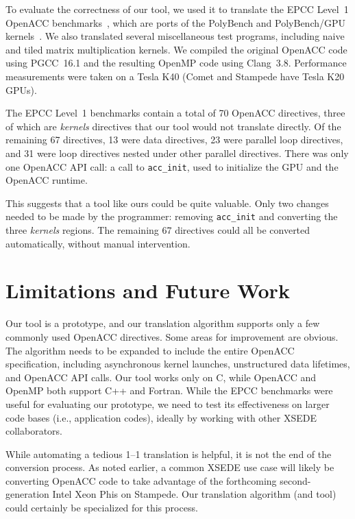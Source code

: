 \documentclass{sig-alternate-05-2015}
\begin{document}
To evaluate the correctness of our tool, we used it to translate the EPCC
Level~1 OpenACC benchmarks~\cite{epcc}, which are ports of the PolyBench and
PolyBench/GPU kernels~\cite{polybench}.  We also translated several
miscellaneous test programs, including naive and tiled matrix multiplication
kernels.  We compiled the original OpenACC code using PGCC~16.1 and the
resulting OpenMP code using Clang~3.8.  Performance measurements were taken on
a Tesla K40 (Comet and Stampede have Tesla K20 GPUs).

The EPCC Level~1 benchmarks contain a total of 70 OpenACC directives, three of
which are \emph{kernels} directives that our tool would not translate directly.
Of the remaining 67 directives, 13 were data directives, 23 were parallel loop
directives, and 31 were loop directives nested under other parallel directives.
There was only one OpenACC API call: a call to \texttt{acc\_init}, used to
initialize the GPU and the OpenACC runtime.

This suggests that a tool like ours could be quite valuable.  Only two changes
needed to be made by the programmer: removing \texttt{acc\_init} and converting
the three \emph{kernels} regions.  The remaining 67 directives could all be
converted automatically, without manual intervention.

\section{Limitations and Future Work}
\label{sec:future}

Our tool is a prototype, and our translation algorithm supports only a few
commonly used OpenACC directives.  Some areas for improvement are obvious.  The
algorithm needs to be expanded to include the entire OpenACC specification,
including asynchronous kernel launches, unstructured data lifetimes, and
OpenACC API calls.  Our tool works only on C, while OpenACC and OpenMP both
support C++ and Fortran.  While the EPCC benchmarks were useful for evaluating
our prototype, we need to test its effectiveness on larger code bases (i.e.,
application codes), ideally by working with other XSEDE collaborators.

While automating a tedious 1--1 translation is helpful, it is not the end of
the conversion process.  As noted earlier, a common XSEDE use case will likely
be converting OpenACC code to take advantage of the forthcoming
second-generation Intel Xeon Phis on Stampede.  Our translation algorithm (and
tool) could certainly be specialized for this process.
\end{document}
